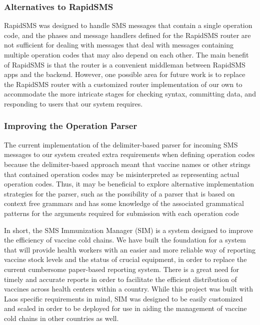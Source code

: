 \documentclass{acm_proc_article-sp}
\begin{document}
\subsubsection{Alternatives to RapidSMS}

RapidSMS was designed to handle SMS messages that contain a single operation code, and the phases and message handlers defined for the RapidSMS router are not sufficient for dealing with messages that deal with messages containing multiple operation codes that may also depend on each other. The main benefit of RapidSMS is that the router is a convenient middleman between RapidSMS apps and the backend. However, one possible area for future work is to replace the RapidSMS router with a customized router implementation of our own to accommodate the more intricate stages for checking syntax, committing data, and responding to users that our system requires. 

\subsubsection{Improving the Operation Parser}

The current implementation of the delimiter-based parser for incoming SMS messages to our system created extra requirements when defining operation codes because the delimiter-based approach meant that vaccine names or other strings that contained operation codes may be misinterpreted as representing actual operation codes. Thus, it may be beneficial to explore alternative implementation strategies for the parser, such as the possibility of a parser that is based on context free grammars and has some knowledge of the associated grammatical patterns for the arguments required for submission with each operation code

In short, the SMS Immunization Manager (SIM) is a system designed to improve the efficiency of vaccine cold chains. We have built the foundation for a system that will provide health workers with an easier and more reliable way of reporting vaccine stock levels and the status of crucial equipment, in order to replace the current cumbersome paper-based reporting system. There is a great need for timely and accurate reports in order to facilitate the efficient distribution of vaccines across health centers within a country. While this project was built with Laos specific requirements in mind, SIM was designed to be easily customized and scaled in order to be deployed for use in aiding the management of vaccine cold chains in other countries as well.  
\end{document}
